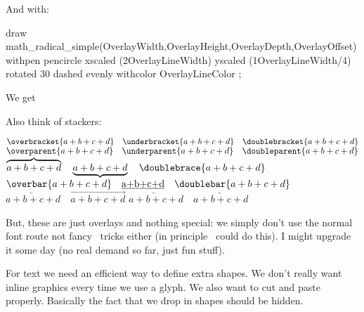 \page

And with:

\startbuffer
{}
draw
    math_radical_simple(OverlayWidth,OverlayHeight,OverlayDepth,OverlayOffset)
    withpen pencircle
        xscaled (2OverlayLineWidth)
        yscaled (1OverlayLineWidth/4)
        rotated 30
    dashed evenly
    withcolor OverlayLineColor ;
\stopuniqueMPgraphic
\stopbuffer

\typebuffer

We get

\startlinecorrection
\getbuffer
{}
\stoplinecorrection

\page

Also think of stackers:

\startbuffer
\setupmathstackers [both]   [color=darkgray,alternative=mp]
\setupmathstackers [top]    [color=darkgray,alternative=mp]
\setupmathstackers [bottom] [color=darkgray,alternative=mp]
\stopbuffer

\typebuffer \getbuffer

\blank[2*line]

\startbuffer
$
    \overbracket   {a+b+c+d} \quad
    \underbracket  {a+b+c+d} \quad
    \doublebracket {a+b+c+d}
$
\blank
$
    \overparent   {a+b+c+d} \quad
    \underparent  {a+b+c+d} \quad
    \doubleparent {a+b+c+d}
$
\blank
$
    \overbrace   {a+b+c+d} \quad
    \underbrace  {a+b+c+d} \quad
    \doublebrace {a+b+c+d}
$
\blank
$
    \overbar   {a+b+c+d} \quad
    \underbar  {a+b+c+d} \quad
    \doublebar {a+b+c+d}
$
\blank
$
    \overleftarrow  {a+b+c+d} \quad
    \overrightarrow {a+b+c+d}
$
\blank
$
    \underleftarrow  {a+b+c+d} \quad
    \underrightarrow {a+b+c+d}
$
\stopbuffer

\getbuffer

\blank[2*line]

But, these are just overlays and nothing special: we simply don't use the normal
font route not fancy \LUA\ tricks either (in principle \MKII\ could do this). I
might upgrade it some day (no real demand so far, just fun stuff).

\stoptitle

\starttitle[title=Real fonts]

\startitemize

\startitem For text we need an efficient way to define extra shapes. \stopitem
\startitem We don't really want inline graphics every time we use a glyph. \stopitem
\startitem We also want to cut and paste properly. \stopitem
\startitem Basically the fact that we drop in shapes should be hidden. \stopitem

